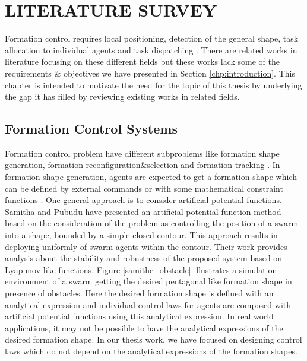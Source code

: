 

\chapter{LITERATURE SURVEY}
\label{chp:Literature Survey}







Formation control requires local positioning, detection of the general shape, task allocation to individual agents and task dispatching \cite{12}. There are related works in literature focusing on these different fields but these works lack some of the requirements $\&$ objectives we have presented in Section \ref{chp:introduction}. This chapter is intended to motivate the need for the topic of this thesis by underlying the gap it has filled by reviewing existing works in related fields. 

\section{Formation Control Systems}
Formation control problem have different subproblems like formation shape generation, formation reconfiguration$\&$selection and formation tracking \cite{12}.  
In formation shape generation, agents are expected to get a formation shape which can be defined by external commands or with some mathematical constraint functions \cite{16}.  One general approach is to consider artificial potential functions. Samitha and Pubudu \cite{17} have presented an artificial potential function method  based on the consideration of the problem as controlling the position of a swarm into a shape, bounded by a simple closed contour. This approach results in deploying uniformly of swarm agents within the contour.  Their work provides analysis about the stability and robustness of the proposed system based on Lyapunov like functions. Figure \ref{samithe_obstacle} illustrates a simulation environment of a swarm getting the desired pentagonal like formation shape in presence of obstacles. Here the desired formation shape is defined with an analytical expression and individual control laws for agents are composed with artificial potential functions using this analytical expression. In real world applications, it may not be possible to have the analytical expressions of the desired formation shape. In our thesis work, we have focused on designing control laws which do not depend on the analytical expressions of the formation shapes.

